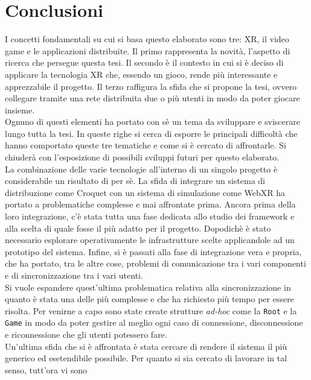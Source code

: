 \chapter*{Conclusioni}
I concetti fondamentali su cui si basa questo elaborato sono tre: XR, il video game e le applicazioni distribuite. Il primo rappresenta la novità, l'aspetto di ricerca che persegue questa
tesi. Il secondo è il contesto in cui si è deciso di applicare la tecnologia XR che, essendo un gioco, rende più interessante e apprezzabile il progetto. Il terzo raffigura 
la sfida che si propone la tesi, ovvero collegare tramite una rete distribuita due o più utenti in modo da poter giocare insieme.\\
Ognuno di questi elementi ha portato con sè un tema da sviluppare e sviscerare lungo tutta la tesi. In queste righe si cerca di esporre le principali difficoltà che hanno comportato queste
tre tematiche e come si è cercato di affrontarle. Si chiuderà con l'esposizione di possibili sviluppi futuri per questo elaborato.\\
\newline
La combinazione delle varie tecnologie all'interno di un singolo progetto è considerabile un risultato di per sè. La sfida di integrare un sistema di distribuzione
come Croquet con un sistema di simulazione come WebXR ha portato a problematiche complesse e mai affrontate prima. Ancora prima della loro integrazione, c'è stata tutta una fase 
dedicata allo studio dei framework e alla scelta di quale fosse il più adatto per il progetto. Dopodichè è stato necessario esplorare operativamente le infrastrutture scelte 
applicandole ad un prototipo del sistema. Infine, si è passati alla fase di integrazione vera e propria, che ha portato, tra le altre cose, problemi di comunicazione tra i vari 
componenti e di sincronizzazione tra i vari utenti.\\
Si vuole espandere quest'ultima problematica relativa alla sincronizzazione in quanto è stata una delle più complesse e che ha richiesto più tempo per essere risolta. Per venirne a 
capo sono state create strutture \textit{ad-hoc} come la \texttt{Root} e la \texttt{Game} in modo da poter gestire al meglio ogni caso di connessione, disconnessione e riconnessione 
che gli utenti potessero fare.\\
Un'ultima sfida che si è affrontata è stata cercare di rendere il sistema il più generico ed esetendibile possibile. Per quanto si sia cercato di lavorare in tal senso, tutt'ora vi sono
